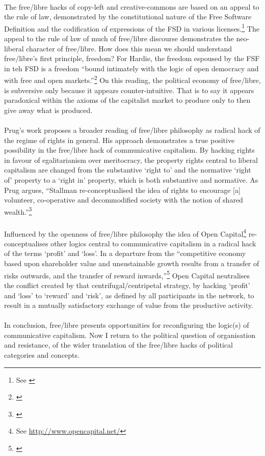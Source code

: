\paragraph{}The free/libre hacks of copy-left and creative-commons are based on an appeal to the rule of law, demonstrated by the constitutional nature of the Free Software Definition and the codification of expressions of the FSD in various licenses.\footnote{See \cite[Chapter 1, \textit{Open Source Licensing, Contract, and Copyright Law}]{Laurent:2004}} The appeal to the rule of law of much of free/libre discourse demonstrates the neo-liberal character of free/libre. How does this mean we should understand free/libre's first principle, freedom? For Hardie, the freedom espoused by the FSF in teh FSD is a freedom ``bound intimately with the logic of open democracy and with free and open markets.''\footnote{\cite[p. 2]{Hardie:2005px}} On this reading, the political economy of free/libre, is subversive only because it appears counter-intuitive. That is to say it appears paradoxical within the axioms of the capitalist market to produce only to then give away what is produced.

\paragraph{}Prug's work proposes a broader reading of free/libre philosophy as radical hack of the regime of rights in general. His approach demonstrates a true positive possibility in the free/libre hack of communicative capitalism. By hacking rights in favour of egalitarianism over meritocracy, the property rights central to liberal capitalism are changed from the substantive `right to' and the normative `right of' property to a `right in' property, which is both substantive and normative. As Prug argues, ``Stallman re-conceptualised the idea of rights to encourage [a] volunteer, co-operative and decommodified society with the notion of shared wealth.''\footnote{\cite{Prug:2007fs}}

\paragraph{}Influenced by the openness of free/libre philosophy the idea of Open Capital\footnote{See \url{http://www.opencapital.net/}} re-conceptualises other logics central to communicative capitalism in a radical hack of the terms `profit' and `loss'. In a departure from the ``competitive economy based upon shareholder value and unsustainable growth results from a transfer of risks outwards, and the transfer of reward inwards,''\footnote{\cite[p. 17]{cook:2004cp}} Open Capital neutralises the conflict created by that centrifugal/centripetal strategy, by hacking `profit' and `loss' to `reward' and `risk', as defined by all participants in the network, to result in a mutually satisfactory exchange of value from the productive activity.

\paragraph{}In conclusion, free/libre presents opportunities for reconfiguring the logic(s) of communicative capitalism. Now I return to the political question of organisation and resistance, of the wider translation of the free/libre hacks of political categories and concepts.

